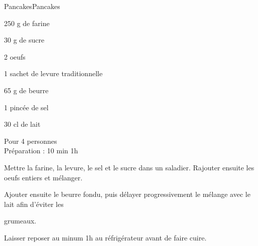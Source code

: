 \begin{recette}{Pancakes}{Pancakes}

\begin{ingredients}
250 g de farine\par
30 g de sucre\par
2 oeufs\par
1 sachet de levure traditionnelle\par
65 g de beurre\par
1 pincée de sel\par
30 cl de lait\par
\end{ingredients}

\begin{infos}
Pour 4 personnes\\
Préparation : 10 min 1h\\
\end{infos}

\begin{etapes}
\item Mettre la farine, la levure, le sel et le sucre dans un saladier. Rajouter ensuite les oeufs entiers et mélanger.
\item Ajouter ensuite le beurre fondu, puis délayer progressivement le mélange avec le lait afin d'éviter les
\item grumeaux.
\item Laisser reposer au minum 1h au réfrigérateur avant de faire cuire.
\end{etapes}

\end{recette}